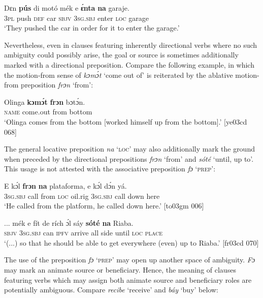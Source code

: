 \ea%
    \label{ex:key:978}
    \gll Dɛn  \textbf{pús}    di  motó  mék    e    \textbf{ɛ́nta}  \textbf{na}  garaje.\\
\textsc{3pl}  push  \textsc{def}  car    \textsc{sbjv}    \textsc{3sg.sbj}  enter  \textsc{loc}  garage\\

\glt ‘They pushed the car in order for it to enter the garage.’
\z

Nevertheless, even in clauses featuring inherently directional verbs where no such ambiguity could possibly arise, the goal or source is sometimes additionally marked with a directional preposition. Compare the following example, in which the motion-from sense of \textit{kɔmɔ́t} ‘come out of’ is reiterated by the ablative motion-from preposition \textit{frɔn} ‘from’:


\ea%
    \label{ex:key:979}
    \gll Olinga  \textbf{kɔmɔ́t}    \textbf{frɔn}    bɔtɔ́n.\\
\textsc{name}  come.out  from  bottom\\

\glt ‘Olinga comes from the bottom [worked himself up from the bottom].’ [ye03cd 068]
\z

The general locative preposition \textit{na} ‘\textsc{loc}’ may also additionally mark the ground when preceded by the directional prepositions \textit{frɔn} ‘from’ and \textit{sóté} ‘until, up to’. This usage is not attested with the associative preposition \textit{fɔ} ‘\textsc{prep’}:


\ea%
    \label{ex:key:980}
    \gll E    kɔ́l  \textbf{frɔn}    \textbf{na} plataforma,  e    kɔ́l  dɔ́n    yá.\\
\textsc{3sg.sbj}  call  from  \textsc{loc}  oil.rig    \textsc{3sg.sbj}  call  down  here\\

\glt ‘He called from the platform, he called down here.’ [to03gm 006]
\z


\ea%
    \label{ex:key:981}
    \gll \op...\cp{}  mék  e    fít  de  rích    ɔ́l  sáy  \textbf{sóté}    \textbf{na} Riaba.\\
{}  \textsc{sbjv}  \textsc{3sg.sbj}  can  \textsc{ipfv}  arrive  all  side  until  \textsc{loc}  \textsc{place}\\

\glt ‘(...) so that he should be able to get everywhere (even) up to Riaba.’ [fr03cd 070]
\z

The use of the preposition \textit{fɔ} ‘\textsc{prep}’ may open up another space of ambiguity. \textit{F}\textit{ɔ} may mark an animate source or beneficiary. Hence, the meaning of clauses featuring verbs which may assign both animate source and beneficiary roles are potentially ambiguous. Compare \textit{recibe} ‘receive’ and \textit{báy} ‘buy’ below: 


